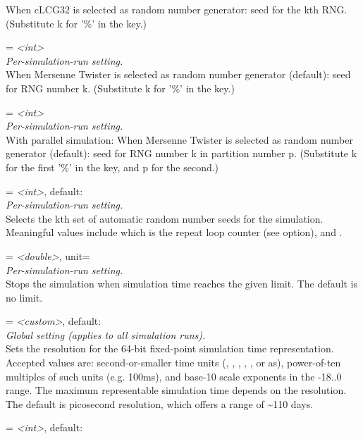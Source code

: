 \begin{description}
    When cLCG32 is selected as random number generator: seed for the kth RNG.
    (Substitute k for '\%' in the key.)
\item[seed-\%-mt] = \textit{<int>}\\
    \textit{Per-simulation-run setting.}\\
    When Mersenne Twister is selected as random number generator (default):
    seed for RNG number k. (Substitute k for '\%' in the key.)
\item[seed-\%-mt-p\%] = \textit{<int>}\\
    \textit{Per-simulation-run setting.}\\
    With parallel simulation: When Mersenne Twister is selected as random
    number generator (default): seed for RNG number k in partition number p.
    (Substitute k for the first '\%' in the key, and p for the second.)
\item[seed-set] = \textit{<int>}, default: \\
    \textit{Per-simulation-run setting.}\\
    Selects the kth set of automatic random number seeds for the simulation.
    Meaningful values include 
    which is the repeat loop counter (see  option), and
    .
\item[sim-time-limit] = \textit{<double>}, unit=\\
    \textit{Per-simulation-run setting.}\\
    Stops the simulation when simulation time reaches the given limit. The
    default is no limit.
\item[simtime-resolution] = \textit{<custom>}, default: \\
    \textit{Global setting (applies to all simulation runs).}\\
    Sets the resolution for the 64-bit fixed-point simulation time
    representation. Accepted values are: second-or-smaller time units (,
    , , , ,  or as), power-of-ten
    multiples of such units (e.g. 100ms), and base-10 scale exponents in the
    -18..0 range. The maximum representable simulation time depends on the
    resolution. The default is picosecond resolution, which offers a range of
    {\textasciitilde}110 days.
\item[simtime-scale] = \textit{<int>}, default: \\

\end{description}
